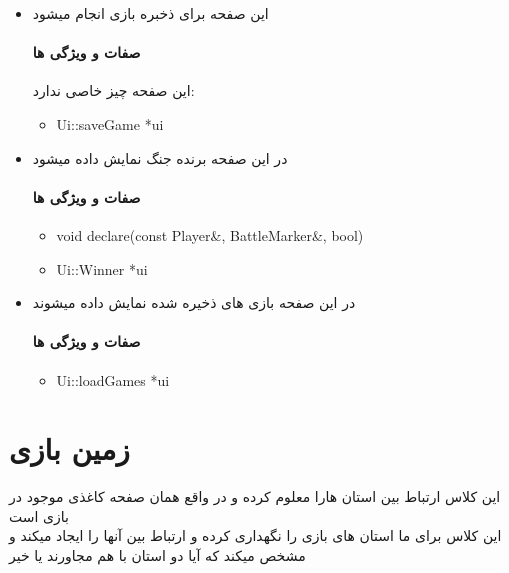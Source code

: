 \documentclass[pdf,titlepage,a4paper]{report}
\begin{document}
\begin{itemize}
		\item {}  این صفحه برای ذخبره بازی انجام میشود\\
		\paragraph{صفات و ویژگی ها} 
          این صفحه چیز خاصی ندارد:
		\begin{latin}
			\begin{itemize}
				\item Ui::saveGame *ui
			\end{itemize}
		\end{latin}

		\item {}   در این صفحه برنده جنگ نمایش داده میشود \\
		\paragraph{صفات و ویژگی ها} 
        
		\begin{latin}
			\begin{itemize}
				\item void declare(const Player&, BattleMarker&, bool)
				\item Ui::Winner *ui

			\end{itemize}
		\end{latin}

		\item {}  در این صفحه بازی های ذخیره شده نمایش داده میشوند \\
		\paragraph{صفات و ویژگی ها} 
		\begin{latin}
			\begin{itemize}
				\item Ui::loadGames *ui
			\end{itemize}
		\end{latin}
	\end{itemize}

	\newpage
	\section{زمین بازی}
    این کلاس ارتباط بین استان هارا معلوم کرده و در واقع همان صفحه کاغذی موجود در بازی است \\
    این کلاس برای ما استان های بازی را نگهداری کرده و ارتباط بین آنها را ایجاد میکند و مشخص میکند که آیا دو استان با هم مجاورند یا خیر 
\end{document}
